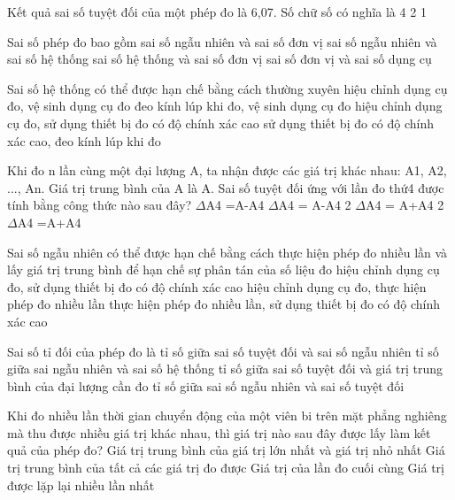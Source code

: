 \begin{ex} Kết quả sai số tuyệt đối của một phép đo là 6,07. Số chữ số có nghĩa là
\choice
{4}
{2}
{}
{1}
\end{ex}

\begin{ex} Sai số phép đo bao gồm
\choice
{sai số ngẫu nhiên và sai số đơn vị}
{\True sai số ngẫu nhiên và sai số hệ thống}
{sai số hệ thống và sai số đơn vị}
{sai số đơn vị và sai số dụng cụ}
\loigiai{}
\end{ex}

\begin{ex} Sai số hệ thống có thể được hạn chế bằng cách thường xuyên
\choice
{hiệu chỉnh dụng cụ đo, vệ sinh dụng cụ đo}
{đeo kính lúp khi đo, vệ sinh dụng cụ đo}
{\True hiệu chỉnh dụng cụ đo, sử dụng thiết bị đo có độ chính xác cao}
{sử dụng thiết bị đo có độ chính xác cao, đeo kính lúp khi đo}
\loigiai{}
\end{ex}

\begin{ex} Khi đo n lần cùng một đại lượng A, ta nhận được các giá trị khác nhau: A1, A2,
..., An. Giá trị trung bình của A là A. Sai số tuyệt đối ứng với lần đo thứ4 được tính bằng
công thức nào sau đây?
\choice
{\True $\Delta$A4 =A-A4}
{$\Delta$A4 = A-A4 2}
{$\Delta$A4 = A+A4 2}
{$\Delta$A4 =A+A4}
\loigiai{}
\end{ex}

\begin{ex} Sai số ngẫu nhiên có thể được hạn chế bằng cách
\choice
{\True thực hiện phép đo nhiều lần và lấy giá trị trung bình để hạn chế sự phân tán của số liệu đo}
{hiệu chỉnh dụng cụ đo, sử dụng thiết bị đo có độ chính xác cao}
{hiệu chỉnh dụng cụ đo, thực hiện phép đo nhiều lần}
{thực hiện phép đo nhiều lần, sử dụng thiết bị đo có độ chính xác cao}
\loigiai{}
\end{ex}

\begin{ex} Sai số tỉ đối của phép đo là
\choice
{tỉ số giữa sai số tuyệt đối và sai số ngẫu nhiên}
{tỉ số giữa sai ngẫu nhiên và sai số hệ thống}
{\True tỉ số giữa sai số tuyệt đối và giá trị trung bình của đại lượng cần đo}
{tỉ số giữa sai số ngẫu nhiên và sai số tuyệt đối}
\loigiai{}
\end{ex}

\begin{ex} Khi đo nhiều lần thời gian chuyển động của một viên bi trên mặt phẳng
nghiêng mà thu được nhiều giá trị khác nhau, thì giá trị nào sau đây được lấy làm kết
quả của phép đo?
\choice
{Giá trị trung bình của giá trị lớn nhất và giá trị nhỏ nhất}
{\True Giá trị trung bình của tất cả các giá trị đo được}
{Giá trị của lần đo cuối cùng}
{Giá trị được lặp lại nhiều lần nhất}
\loigiai{}
\end{ex}

